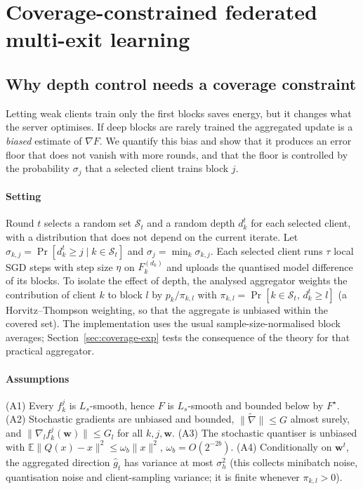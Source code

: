 \section{Coverage-constrained federated multi-exit learning}\label{sec:method}

\subsection{Why depth control needs a coverage constraint}\label{sec:theory}
Letting weak clients train only the first blocks saves energy, but it changes what the server optimises. If deep blocks are rarely trained the aggregated update is a \emph{biased} estimate of $\nabla F$. We quantify this bias and show that it produces an error floor that does not vanish with more rounds, and that the floor is controlled by the probability $\sigma_j$ that a selected client trains block $j$.

\paragraph{Setting}
Round $t$ selects a random set $\mathcal S_t$ and a random depth $d_k^t$ for each selected client, with a distribution that does not depend on the current iterate. Let $\sigma_{k,j}=\Pr[d_k^t\ge j\mid k\in\mathcal S_t]$ and $\sigma_j=\min_k\sigma_{k,j}$. Each selected client runs $\tau$ local SGD steps with step size $\eta$ on $F_k^{(d_k)}$ and uploads the quantised model difference of its blocks. To isolate the effect of depth, the analysed aggregator weights the contribution of client $k$ to block $l$ by $p_k/\pi_{k,l}$ with $\pi_{k,l}=\Pr[k\in\mathcal S_t,\,d_k^t\ge l]$ (a Horvitz--Thompson weighting, so that the aggregate is unbiased within the covered set). The implementation uses the usual sample-size-normalised block averages; Section~\ref{sec:coverage-exp} tests the consequence of the theory for that practical aggregator.

\paragraph{Assumptions}
(A1) Every $f_k^{j}$ is $L_s$-smooth, hence $F$ is $L_s$-smooth and bounded below by $F^\star$.
(A2) Stochastic gradients are unbiased and bounded, $\|\tilde\nabla\|\le G$ almost surely, and $\|\nabla_l f_k^{j}(\mathbf w)\|\le G_l$ for all $k,j,\mathbf w$.
(A3) The stochastic quantiser is unbiased with $\mathbb E\|Q(x)-x\|^2\le\omega_b\|x\|^2$, $\omega_b=O(2^{-2b})$.
(A4) Conditionally on $\mathbf w^t$, the aggregated direction $\hat g_t$ has variance at most $\sigma_h^2$ (this collects minibatch noise, quantisation noise and client-sampling variance; it is finite whenever $\pi_{k,l}>0$).

